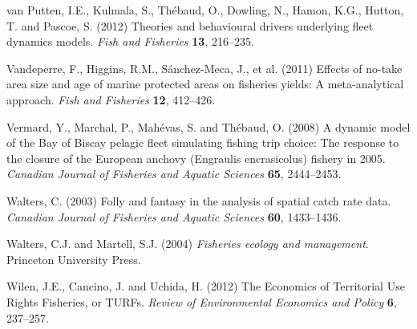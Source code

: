 \documentclass[twoside,12pt,final]{ucthesis-CA2012}
\begin{document}
\begin{ucmainmatter}
\hypertarget{ref-vanPutten2012}{}
van Putten, I.E., Kulmala, S., Thébaud, O., Dowling, N., Hamon, K.G.,
Hutton, T. and Pascoe, S. (2012) Theories and behavioural drivers
underlying fleet dynamics models. \emph{Fish and Fisheries} \textbf{13},
216--235.

\hypertarget{ref-Vandeperre2011}{}
Vandeperre, F., Higgins, R.M., Sánchez-Meca, J., et al. (2011) Effects
of no-take area size and age of marine protected areas on fisheries
yields: A meta-analytical approach. \emph{Fish and Fisheries}
\textbf{12}, 412--426.

\hypertarget{ref-Vermard2008}{}
Vermard, Y., Marchal, P., Mahévas, S. and Thébaud, O. (2008) A dynamic
model of the Bay of Biscay pelagic fleet simulating fishing trip choice:
The response to the closure of the European anchovy (Engraulis
encrasicolus) fishery in 2005. \emph{Canadian Journal of Fisheries and
Aquatic Sciences} \textbf{65}, 2444--2453.

\hypertarget{ref-Walters2003}{}
Walters, C. (2003) Folly and fantasy in the analysis of spatial catch
rate data. \emph{Canadian Journal of Fisheries and Aquatic Sciences}
\textbf{60}, 1433--1436.

\hypertarget{ref-Walters2004}{}
Walters, C.J. and Martell, S.J. (2004) \emph{Fisheries ecology and
management}. Princeton University Press.

\hypertarget{ref-Wilen2012}{}
Wilen, J.E., Cancino, J. and Uchida, H. (2012) The Economics of
Territorial Use Rights Fisheries, or TURFs. \emph{Review of
Environmental Economics and Policy} \textbf{6}, 237--257.

\end{ucmainmatter}
\end{document}
